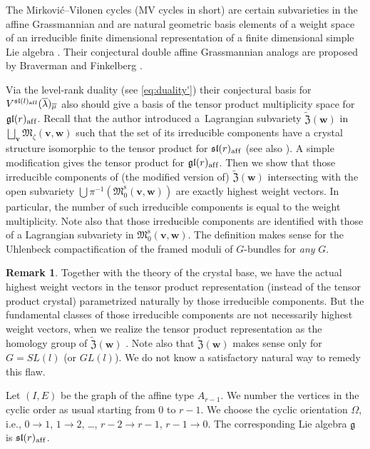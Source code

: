 \documentclass[10pt,a4paper]{amsart}
\theoremstyle{definition}
\newtheorem{Remark}[equation]{Remark}
\numberwithin{equation}{section}
\newcommand{\algsl}{\operatorname{\mathfrak{sl}}} %
\newcommand{\gl}{\operatorname{\mathfrak{gl}}}
\newcommand{\g}{{\mathfrak g}}
\newcommand{\M}{{\mathfrak M}} %
\newcommand{\Mreg}{\M^{\operatorname{s}}}
\newcommand{\bv}{{\mathbf v}} %
\newcommand{\bw}{{\mathbf w}} %
\newcommand{\aff}{\mathrm{af\/f}}
\begin{document}
The Mirkovi\'c--Vilonen cycles (MV cycles in short) are certain
subvarieties in the af\/f\/ine Grassmannian and are natural geometric
basis elements of a weight space of an irreducible f\/inite dimensional
representation of a f\/inite dimensional simple Lie algebra \cite{MV}.
Their conjectural double af\/f\/ine Grassmannian analogs are proposed
by Braverman and Finkelberg \cite{braverman-prep}.

Via the level-rank duality (see \eqref{eq:duality'}) their conjectural
basis for $V^{\algsl(l)_\aff}(\overline{\lambda})_{\overline{\mu}}$
also should give a basis of the tensor product multiplicity space for
$\gl(r)_\aff$.
%
Recall that the author introduced a~Lagrangian subvariety
$\widetilde{\mathfrak Z}(\bw)$ in $\bigsqcup_{\bv} \M_\zeta(\bv,\bw)$
such that the set of its irreducible components have a crystal
structure isomorphic to the tensor product for $\algsl(r)_\aff$
\cite{Na-tensor} (see also \cite{Malkin}).
%
A simple modif\/ication gives the tensor product for $\gl(r)_\aff$. Then
we show that those irreducible components of (the modif\/ied version of)
$\widetilde{\mathfrak Z}(\bw)$ intersecting with the open subvariety
$\bigcup \pi^{-1}(\Mreg_0(\bv,\bw))$ are exactly highest weight
vectors. In particular, the number of such irreducible components is
equal to the weight multiplicity. Note also that those irreducible
components are identif\/ied with those of a Lagrangian subvariety in
$\Mreg_0(\bv,\bw)$. The def\/inition makes sense for the Uhlenbeck
compactif\/ication of the framed moduli of $G$-bundles for {\it any\/}
$G$.

\begin{Remark}
  Together with the theory of the crystal base, we have the actual
  highest weight vectors in the tensor product representation (instead
  of the tensor product crystal) parametrized naturally by those
  irreducible components. But the fundamental classes of those
  irreducible components are not necessarily highest weight vectors,
  when we realize the tensor product representation as the homology
  group of $\widetilde{\mathfrak Z}(\bw)$ \cite{Na-tensor}. Note also
  that $\widetilde{\mathfrak Z}(\bw)$ makes sense only for $G = SL(l)$
  (or $GL(l)$). We do not know a satisfactory natural way to remedy
  this f\/law.
\end{Remark}

Let $(I,E)$ be the graph of the af\/f\/ine type $A_{r-1}$. We number the
vertices in the cyclic order as usual starting from $0$ to $r-1$. We
choose the cyclic orientation $\Omega$, i.e., $0\to 1$, $1\to 2$,
\dots, $r-2\to r-1$, $r-1 \to 0$. The corresponding Lie algebra $\g$
is $\algsl(r)_\aff$.
\end{document}
